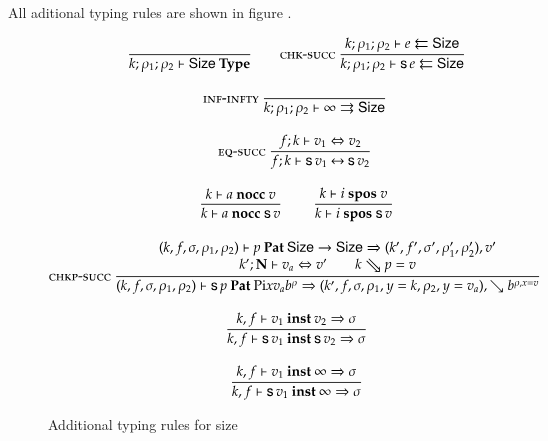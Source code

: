 All aditional typing rules are shown in figure \cite{str}.
\begin{figure}[p]
\begin{gather*}
\nru{}{}{\IsType{k}{\rho_1}{\rho_2}{\Size}}
\qquad
\nru{\chksucc}
{\Check{k}{\rho_1}{\rho_2}{e}{\Size}}
{\Check{k}{\rho_1}{\rho_2}{\s e}{\Size}} 
\\[2ex]
\nru{\infinfty}{}{\Infer{k}{\rho_1}{\rho_2}{\infty}{\Size}} 
\\[2ex]
\nru{\eqsuc}
{\EqVal{f}{k}{v_1}{v_2}}
{\FeqVal{f}{k}{\s v_1}{\s v_2}}
\\[2ex]
\nru{}
{\nocc{k}{a}{v}}
{\nocc{k}{a}{\s v}}
\qquad
\nru{}
{\spos{k}{i}{v}}
{\spos{k}{i}{\s v}}
\\[2ex]
\ndru{\chkpsucc}
{
\checkp{k,f,\sigma,\rho_1,\rho_2}{p}{\Size \ra \Size}
{k',f',\sigma',\rho'_1,\rho'_2}{v'}}
{
\EqVal{k'}{\nF}{v_a}{v'} \qquad
\ptv{k}{p} = v
}
{
\checkp
{k,f,\sigma,\rho_1,\rho_2}
{\s p}
{\vpi x v_a \cl{b}{\rho}}
{k',f,\sigma,\ins{\rho_1}{y}{k},\ins{\rho_2}{y}{v_a}}
{\wh \cl{b}{\ins{\rho}{x}{v}}}}
\\[2ex]
\nru{}
{\inst{k}{f}{v_1}{v_2}{\sigma}}
{\inst{k}{f}{\s v_1}{\s v_2}{\sigma}
}
\\[2ex]
\nru{}
{\inst{k}{f}{v_1}{\infty}{\sigma}}
{\inst{k}{f}{\s v_1}{\infty}{\sigma}
}
\end{gather*}
\label{str}
\caption{Additional typing rules for size}
\end{figure}

